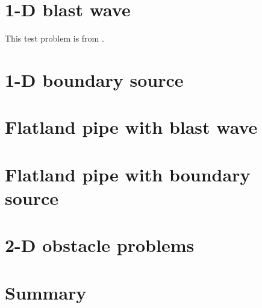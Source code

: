 \section{1-D blast wave}
This test problem is from \cite{Rau2005,Ols2007}.

\section{1-D boundary source}

\section{Flatland pipe with blast wave}

\section{Flatland pipe with boundary source}

\section{2-D obstacle problems}
\cite{Mou2006}

\section{Summary}

